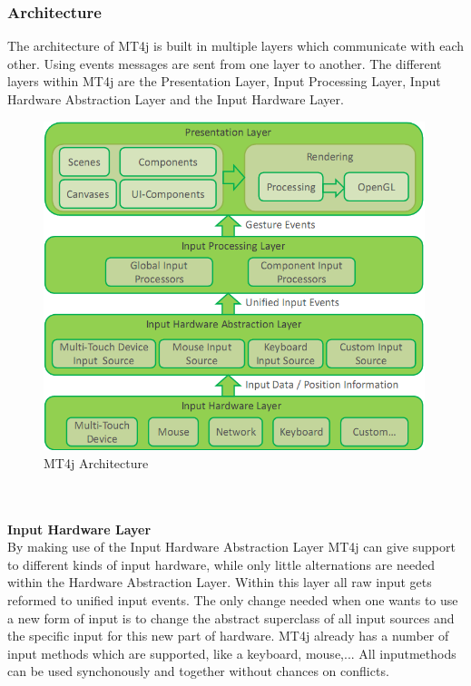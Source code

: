 \documentclass[a4paper,12pt]{report}
\begin{document}
\subsubsection{Architecture}
The architecture of MT4j is built in multiple layers which communicate with each other. Using events messages are sent from one layer to another. The different layers within MT4j are the 
Presentation Layer, Input Processing Layer, Input Hardware Abstraction Layer and the Input Hardware Layer.
\begin{figure}
  \centering
    \includegraphics[width=0.99\textwidth]{images/ArchitectureOverview2.png}
  \caption{MT4j Architecture}
\end{figure}
\\
\\
\textbf{Input Hardware Layer}
\\
By making use of the Input Hardware Abstraction Layer MT4j can give support to different kinds of input hardware, while only little alternations are needed within the Hardware Abstraction Layer.
Within this layer all raw input gets reformed to unified input events. The only change needed when one wants to use a new form of input is to change the abstract superclass of all input sources
and the specific input for this new part of hardware.
MT4j already has a number of input methods which are supported, like a keyboard, mouse,... All inputmethods can be used synchonously and together without chances on conflicts.
\\
\\
\end{document}
